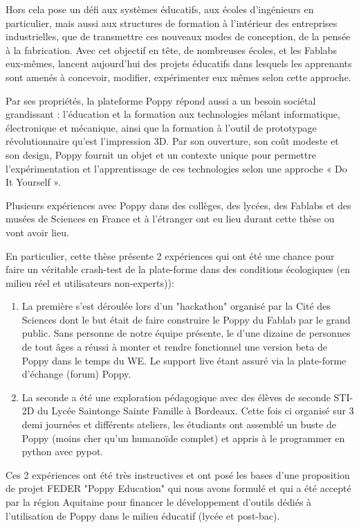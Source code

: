 Hors cela pose un défi aux systèmes éducatifs, aux écoles d’ingénieurs en particulier, mais aussi aux structures de formation à l’intérieur des entreprises industrielles, que de transmettre ces nouveaux modes de conception, de la pensée à la fabrication. Avec cet objectif en tête, de nombreuses écoles, et les Fablabs eux-mêmes, lancent aujourd’hui des projets éducatifs dans lesquels les apprenants sont amenés à concevoir, modifier, expérimenter eux mêmes selon cette approche.

Par ses propriétés, la plateforme Poppy répond aussi a un besoin sociétal grandissant : l’éducation et la formation aux technologies mêlant informatique, électronique et mécanique, ainsi que la formation à l’outil de prototypage révolutionnaire qu’est l’impression 3D. Par son ouverture, son coût modeste et son design, Poppy fournit un objet et un contexte unique pour permettre l’expérimentation et l’apprentissage de ces technologies selon une approche « Do It Yourself ».

Plusieurs expériences avec Poppy dans des collèges, des lycées, des Fablabs et des musées de Sciences en France et à l’étranger ont eu lieu durant cette thèse ou vont avoir lieu.

En particulier, cette thèse présente 2 expériences qui ont été une chance pour faire un véritable crash-test de la plate-forme dans des conditions écologiques (en milieu réel et utilisateurs non-experts)):
\begin{enumerate}
    \item La première s'est déroulée lors d'un "hackathon" organisé par la Cité des Sciences dont le but était de faire construire le Poppy du Fablab par le grand public. Sans personne de notre équipe présente, le d'une dizaine de personnes de tout âges a réussi à monter et rendre fonctionnel une version beta de Poppy dans le temps du WE. Le support live étant assuré via la plate-forme d'échange (forum) Poppy.
    \item La seconde a été une exploration pédagogique avec des élèves de seconde STI-2D du Lycée Saintonge Sainte Famille à Bordeaux. Cette fois ci organisé sur 3 demi journées et différents ateliers, les étudiants ont assemblé un buste de Poppy (moins cher qu'un humanoïde complet) et appris à le programmer en python avec pypot.
\end{enumerate}


Ces 2 expériences ont été très instructives et ont posé les bases d'une proposition de projet FEDER "Poppy Education" qui nous avons formulé et qui a été accepté par la région Aquitaine pour financer le développement d'outils dédiés à l'utilisation de Poppy dans le milieu éducatif (lycée et post-bac).

